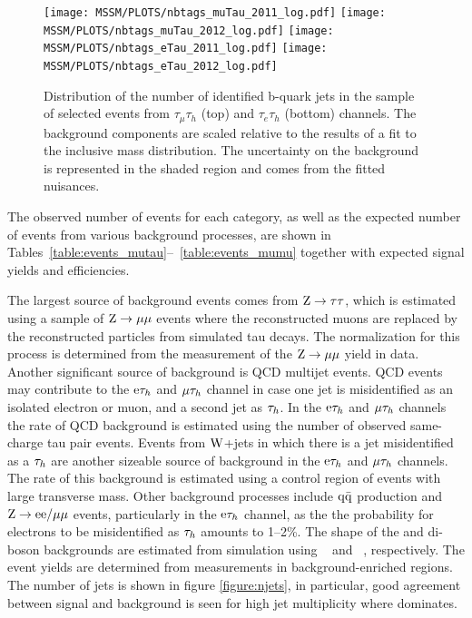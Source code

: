 \begin{figure}[htbp]
  \begin{center}
    \texttt{[image: MSSM/PLOTS/nbtags\_muTau\_2011\_log.pdf]}
    \texttt{[image: MSSM/PLOTS/nbtags\_muTau\_2012\_log.pdf]}
    \texttt{[image: MSSM/PLOTS/nbtags\_eTau\_2011\_log.pdf]}
    \texttt{[image: MSSM/PLOTS/nbtags\_eTau\_2012\_log.pdf]}
    \caption{
      Distribution of the number of identified b-quark jets in the sample of
selected events from $\tau_{\mu}\tau_{h}$ (top) and  $\tau_{e}\tau_{h}$ (bottom)
channels.  The background components are scaled relative to the results of a fit
to the inclusive mass distribution.  The uncertainty on the background is represented
in the shaded region and comes from the fitted nuisances.
    }
    \label{fig:nbjets}
  \end{center}
\end{figure}



The observed number of events for each category, as well as the expected number of events from various background processes, 
are shown in Tables~\ref{table:events_mutau}--~\ref{table:events_mumu} together with expected signal yields and efficiencies.

The largest source of background events comes from $\mathrm{Z}\to\mathrm{\tau}\mathrm{\tau}$, which is estimated using a sample of $\mathrm{Z}\to\mathrm{\mu}\mathrm{\mu}$ events where the reconstructed muons are replaced by the reconstructed particles from simulated tau decays. The normalization for this process is determined from the measurement of the $\mathrm{Z}\to\mathrm{\mu}\mathrm{\mu}$ yield in data. 
Another significant source of background is QCD multijet events.
QCD events may contribute to the $\mathrm{e}\mathrm{\tau}_h$ and $\mathrm{\mu}\mathrm{\tau}_h$ channel
in case one jet is misidentified as an isolated electron or muon, and a second jet as $\mathrm{\tau}_h$.
In the $\mathrm{e}\mathrm{\tau}_h$ and $\mathrm{\mu}\mathrm{\tau}_h$ channels the rate of QCD background is estimated using the number of observed same-charge
tau pair events.
Events from $\mathrm{W}$+jets in which there is a jet misidentified as a $\mathrm{\tau}_h$ are another sizeable source of background in the $\mathrm{e}\mathrm{\tau}_h$ and $\mathrm{\mu}\mathrm{\tau}_h$ channels.
The rate of this background is estimated using a control region of events with large transverse mass.
Other background processes include $\mathrm{q}\mathrm{\bar{q}}$ production
and $\mathrm{Z}\to \mathrm{e}\mathrm{e}/\mathrm{\mu}\mathrm{\mu}$ events, particularly in the $\mathrm{e}\mathrm{\tau}_h$ channel, 
as the the probability for electrons to be misidentified as $\mathrm{\tau}_h$ amounts to 1--2\%.
The shape of the \ttbar  and di-boson backgrounds are estimated from simulation 
using \MADGRAPH~\cite{Alwall:2007st} and \PYTHIA~\cite{Pythia}, respectively. The event yields are determined from measurements in background-enriched regions.
The number of jets is shown in figure \ref{figure:njets}, in particular, good agreement
between signal and background is seen for high jet multiplicity where \ttbar dominates.

